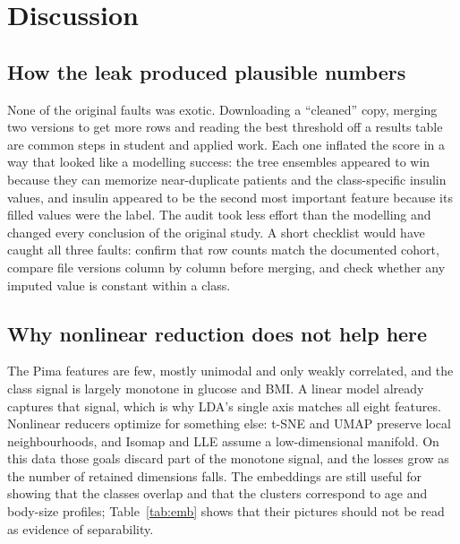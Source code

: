\documentclass[conference]{IEEEtran}
\begin{document}
\section{Discussion}

\subsection{How the leak produced plausible numbers}
None of the original faults was exotic. Downloading a ``cleaned'' copy, merging two versions to get more rows and reading the best threshold off a results table are common steps in student and applied work. Each one inflated the score in a way that looked like a modelling success: the tree ensembles appeared to win because they can memorize near-duplicate patients and the class-specific insulin values, and insulin appeared to be the second most important feature because its filled values were the label. The audit took less effort than the modelling and changed every conclusion of the original study. A short checklist would have caught all three faults: confirm that row counts match the documented cohort, compare file versions column by column before merging, and check whether any imputed value is constant within a class.

\subsection{Why nonlinear reduction does not help here}
The Pima features are few, mostly unimodal and only weakly correlated, and the class signal is largely monotone in glucose and BMI. A linear model already captures that signal, which is why LDA's single axis matches all eight features. Nonlinear reducers optimize for something else: t-SNE and UMAP preserve local neighbourhoods, and Isomap and LLE assume a low-dimensional manifold. On this data those goals discard part of the monotone signal, and the losses grow as the number of retained dimensions falls. The embeddings are still useful for showing that the classes overlap and that the clusters correspond to age and body-size profiles; Table~\ref{tab:emb} shows that their pictures should not be read as evidence of separability.
\end{document}
